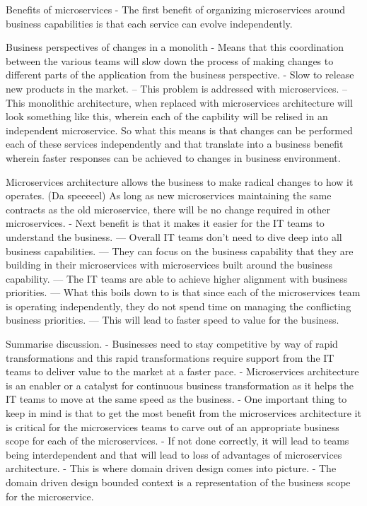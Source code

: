 Benefits of microservices
- The first benefit of organizing microservices around business capabilities is that each service can evolve independently.

Business perspectives of changes in a monolith
- Means that this coordination between the various teams will slow down the process of making changes to different parts of the application from the business perspective.
- Slow to release new products in the market.
-- This problem is addressed with microservices.
-- This monolithic architecture, when replaced with microservices architecture will look something like this, wherein each of the capbility will be relised in an independent microservice.
So what this means is that changes can be performed each of these services independently and that translate into a business benefit wherein faster responses can be achieved to changes in business environment.

Microservices architecture allows the business to make radical changes to how it operates. (Da speeeeel)
As long as new microservices maintaining the same contracts as the old microservice, there will be no change required in other microservices.
- Next benefit is that it makes it easier for the IT teams to understand the business.
--- Overall IT teams don't need to dive deep into all business capabilities.
--- They can focus on the business capability that they are building in their microservices with microservices built around the business capability.
--- The IT teams are able to achieve higher alignment with business priorities.
--- What this boils down to is that since each of the microservices team is operating independently, they do not spend time on managing the conflicting business priorities.
--- This will lead to faster speed to value for the business.

Summarise discussion.
- Businesses need to stay competitive by way of rapid transformations and this rapid transformations require support from the IT teams to deliver value to the market at a faster pace.
- Microservices architecture is an enabler or a catalyst for continuous business transformation as it helps the IT teams to move at the same speed as the business.
- One important thing to keep in mind is that to get the most benefit from the microservices architecture it is critical for the microservices teams to carve out of an appropriate business scope for each of the microservices.
- If not done correctly, it will lead to teams being interdependent and that will lead to loss of advantages of microservices architecture.
- This is where domain driven design comes into picture.
- The domain driven design bounded context is a representation of the business scope for the microservice.

